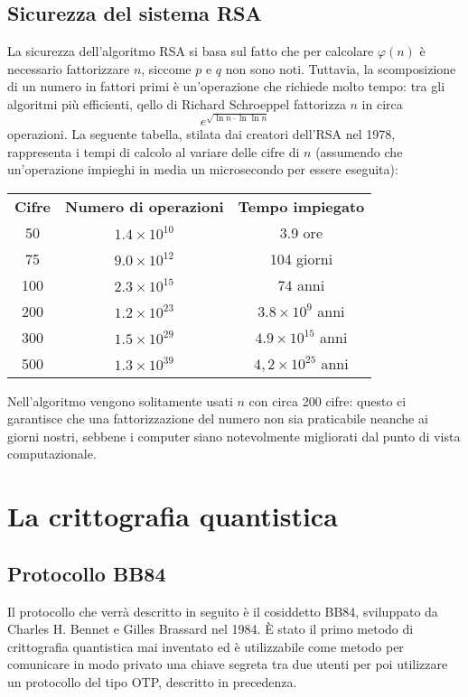 \documentclass[italian,A4,12pt]{article}
\begin{document}
      \subsection{Sicurezza del sistema RSA}
      La sicurezza dell'algoritmo RSA si basa sul fatto che per calcolare $\varphi(n)$ è necessario fattorizzare $n$, siccome $p$ e $q$ non sono noti.
      Tuttavia, la scomposizione di un numero in fattori primi è un'operazione che richiede molto tempo: tra gli algoritmi più efficienti, qello di Richard Schroeppel fattorizza $n$ in circa $$e^{\sqrt{\ln{n}\cdot\ln{\ln{n}}}}$$
      operazioni. La seguente tabella, stilata dai creatori dell'RSA nel 1978, rappresenta i tempi di calcolo al variare delle cifre di $n$ (assumendo che un'operazione impieghi in media un microsecondo per essere eseguita):
      ~\\
      \begin{center}
        \begin{tabular}{c c c}
          \textbf{Cifre}&\textbf{Numero di operazioni}&\textbf{Tempo impiegato}\\
          50&$1.4\times 10^{10}$&3.9 ore\\
          75&$9.0\times 10^{12}$&104 giorni\\
          100&$2.3\times 10^{15}$&74 anni\\
          200&$1.2\times 10^{23}$&$3.8\times 10^9$ anni\\
          300&$1.5\times 10^{29}$&$4.9\times 10^{15}$ anni\\
          500&$1.3\times 10^{39}$&$4,2\times 10^{25}$ anni\\

        \end{tabular}
      \end{center}
      Nell'algoritmo vengono solitamente usati $n$ con circa 200 cifre: questo ci garantisce che una fattorizzazione del numero non sia praticabile neanche ai giorni nostri, sebbene i computer siano notevolmente migliorati dal punto di vista computazionale.

      \newpage
  \section{La crittografia quantistica}
    \subsection{Protocollo BB84}
    Il protocollo che verrà descritto in seguito è il cosiddetto BB84, sviluppato da Charles H. Bennet e Gilles Brassard nel 1984.
    È stato il primo metodo di crittografia quantistica mai inventato ed è utilizzabile come metodo per comunicare in modo privato una chiave segreta tra due utenti per poi utilizzare un protocollo del tipo OTP, descritto in precedenza.\\
\end{document}
